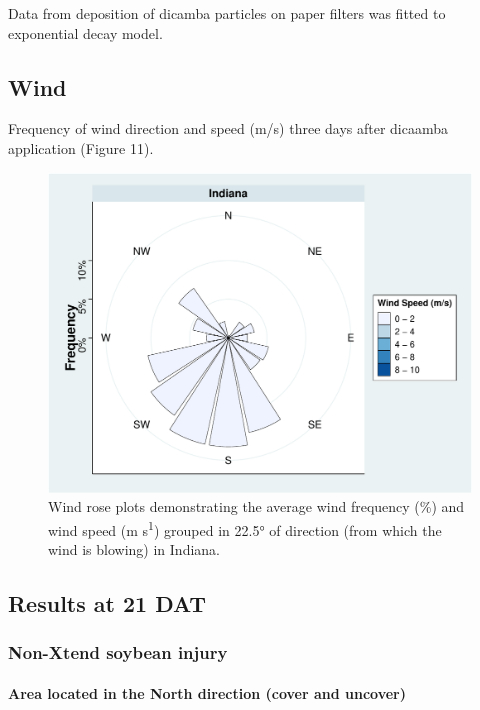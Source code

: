 \documentclass[]{article}
\let\oldparagraph\paragraph
\renewcommand{\paragraph}[1]{\oldparagraph{#1}\mbox{}}
\begin{document}
Data from deposition of dicamba particles on paper filters was fitted to
exponential decay model.

\pagebreak
\newpage

\subsection{Wind}\label{wind-1}

Frequency of wind direction and speed (m/s) three days after dicaamba
application (Figure 11).

\begin{figure}
\centering
\includegraphics{Report_files/figure-latex/unnamed-chunk-27-1.pdf}
\caption{Wind rose plots demonstrating the average wind frequency (\%)
and wind speed (m s\textsuperscript{1}) grouped in 22.5° of direction
(from which the wind is blowing) in Indiana.}
\end{figure}

\pagebreak
\newpage

\subsection{Results at 21 DAT}\label{results-at-21-dat}

\subsubsection{Non-Xtend soybean
injury}\label{non-xtend-soybean-injury-2}

\paragraph{\texorpdfstring{Area located in the \textbf{North} direction
(cover and
uncover)}{Area located in the North direction (cover and uncover)}}\label{area-located-in-the-north-direction-cover-and-uncover}
\end{document}

